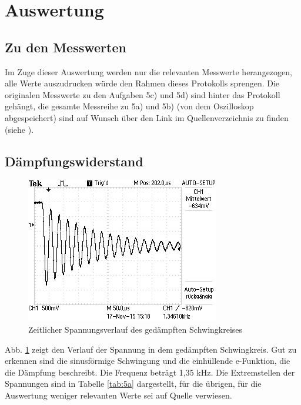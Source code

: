 \section{Auswertung}
\label{sec:Auswertung}
\subsection{Zu den Messwerten}
Im Zuge dieser Auswertung werden nur die relevanten Messwerte herangezogen,
alle Werte auszudrucken würde den Rahmen dieses Protokolls sprengen.
Die originalen Messwerte zu den Aufgaben 5c) und 5d) sind hinter das Protokoll
gehängt, die gesamte Messreihe zu 5a) und 5b) (von dem Oszilloskop abgespeichert)
sind auf Wunsch über den Link im Quellenverzeichnis zu finden
(siehe \cite{messwerte}).
\subsection{Dämpfungswiderstand}
\begin{figure}[H]
  \centering
  \includegraphics[width=\textwidth]{data/F0000TEK.jpg}
  \caption{Zeitlicher Spannungsverlauf des gedämpften Schwingkreises}
  \label{fig:5aergebnis}
\end{figure}
Abb. \ref{fig:5aergebnis} zeigt den Verlauf der Spannung in dem gedämpften
Schwingkreis. Gut zu erkennen sind die sinusförmige Schwingung und
die einhüllende e-Funktion, die die Dämpfung beschreibt.
Die Frequenz beträgt 1,35 kHz.
Die Extremstellen der Spannungen sind in Tabelle \ref{tab:5a} dargestellt,
für die übrigen, für die Auswertung weniger relevanten
Werte sei auf Quelle \cite{messwerte} verwiesen.

